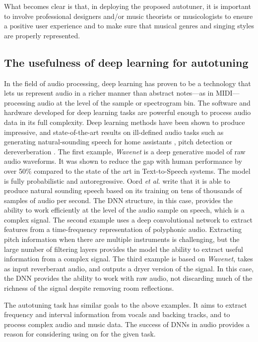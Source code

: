 What becomes clear is that, in deploying the proposed autotuner, it is important to involve professional designers and/or music theorists or musicologists to ensure a positive user experience and to make sure that musical genres and singing styles are properly represented.

\subsection{The usefulness of deep learning for autotuning}
In the field of audio processing, deep learning has proven to be a technology that lets us represent audio in a richer manner than abstract notes---as in MIDI---processing audio at the level of the sample or spectrogram bin. The software and hardware developed for deep learning tasks are powerful enough to process audio data in its full complexity. Deep learning methods have been shown to produce impressive, and state-of-the-art results on ill-defined audio tasks such as generating natural-sounding speech for home assistants \cite{oord2016wavenet}, pitch detection \cite{bittner2017deep} or dereverberation \cite{su2020hifi}. The first example, \textit{Wavenet} is a deep generative model of raw audio waveforms. It was shown to reduce the gap with human performance by over 50\% compared to the state of the art in Text-to-Speech systems. The model is fully probabilistic and autoregressive. Oord \textit{et al.} write that it is able to produce natural sounding speech based on its training on tens of thousands of samples of audio per second. The DNN structure, in this case, provides the ability to work efficiently at the level of the audio sample on speech, which is a complex signal. The second example uses a deep convolutional network to extract features from a time-frequency representation of polyphonic audio. Extracting pitch information when there are multiple instruments is challenging, but the large number of filtering layers provides the model the ability to extract useful information from a complex signal. The third example is based on \textit{Wavenet}, takes as input reverberant audio, and outputs a dryer version of the signal. In this case, the DNN provides the ability to work with raw audio, not discarding much of the richness of the signal despite removing room reflections.

The autotuning task has similar goals to the above examples. It aims to extract frequency and interval information from vocals and backing tracks, and to process complex audio and music data. The success of DNNs in audio provides a reason for considering using on for the given task.